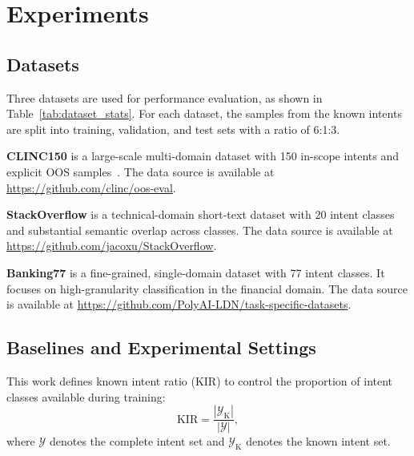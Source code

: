 \documentclass[11pt]{article}
\begin{document}
\section{Experiments}
\subsection{Datasets}
Three datasets are used for performance evaluation, as shown in Table~\ref{tab:dataset_stats}. For each dataset, the samples from the known intents are split into training, validation, and test sets with a ratio of 6:1:3.


\textbf{CLINC150} is a large-scale multi-domain dataset with 150 in-scope intents and explicit OOS samples~\citep{larson2019evaluation}. The data source is available at \url{https://github.com/clinc/oos-eval}.

\textbf{StackOverflow} is a technical-domain short-text dataset with 20 intent classes and substantial semantic overlap across classes. The data source is available at \url{https://github.com/jacoxu/StackOverflow}.

\textbf{Banking77} is a fine-grained, single-domain dataset with 77 intent classes. It focuses on high-granularity classification in the financial domain. The data source is available at \url{https://github.com/PolyAI-LDN/task-specific-datasets}.

\begin{table}[H]
\centering
\renewcommand{\arraystretch}{1.05}
\caption{Dataset statistics.}
\label{tab:dataset_stats}
\end{table}

\subsection{Baselines and Experimental Settings}
This work defines known intent ratio (KIR) to control the proportion of intent classes available during training:
\begin{equation}
\mathrm{KIR}=\frac{|\mathcal{Y}_{\mathrm{K}}|}{|\mathcal{Y}|},
\end{equation}
where $\mathcal{Y}$ denotes the complete intent set and $\mathcal{Y}_{\mathrm{K}}$ denotes the known intent set.
\end{document}
